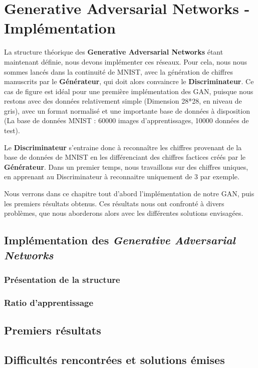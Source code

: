 \chapter{Generative Adversarial Networks - Implémentation}

 La structure théorique des \textbf{Generative Adversarial Networks} étant maintenant définie, nous devons implémenter ces réseaux. Pour cela, nous nous sommes lancés dans la continuité de MNIST, avec la génération de chiffres manuscrits par le \textbf{Générateur}, qui doit alors convaincre le \textbf{Discriminateur}. Ce cas de figure est idéal pour une première implémentation des GAN, puisque nous restons avec des données relativement simple (Dimension 28*28, en niveau de gris), avec un format normalisé et une importante base de données à disposition (La base de données MNIST : 60000 images d'apprentissages, 10000 données de test).

Le \textbf{Discriminateur} s'entraine donc à reconnaître les chiffres provenant de la base de données de MNIST en les différenciant des chiffres factices créés par le \textbf{Générateur}. Dans un premier temps, nous travaillons sur des chiffres uniques, en apprenant au Discriminateur à reconnaitre uniquement de 3 par exemple.

Nous verrons dans ce chapitre tout d'abord l'implémentation de notre GAN, puis les premiers résultats obtenus. Ces résultats nous ont confronté à divers problèmes, que nous aborderons alors avec les différentes solutions envisagées.


\section{Implémentation des \textit{Generative Adversarial Networks}}
\subsection{Présentation de la structure}
\subsection{Ratio d'apprentissage}

\section{Premiers résultats}

\section{Difficultés rencontrées et solutions émises}

